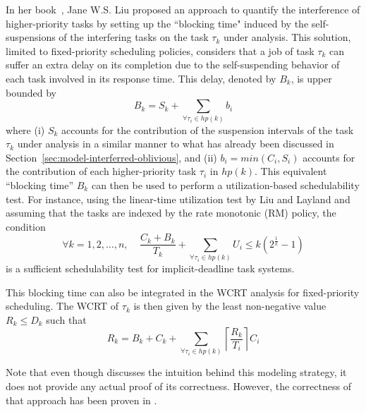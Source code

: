 \label{sec:model-interfering-blocking}

In her book~\cite[Pages 164-165]{Liu:2000:RS:518501}, Jane W.S. Liu proposed an approach to quantify the interference of
higher-priority tasks by setting up the ``blocking time" induced by the self-suspensions of the interfering tasks on the 
task $\tau_k$ under analysis. This solution, limited to fixed-priority scheduling policies, considers that a job of 
task $\tau_k$ can suffer an extra delay on its completion due to the self-suspending behavior of each task involved in its 
response time. This delay, denoted by $B_k$, is upper bounded by 
\begin{equation*}
B_k=S_k+\sum_{\forall \tau_i \in hp(k)} b_i
\end{equation*}
where (i) $S_k$ accounts for the contribution of the suspension intervals of the task $\tau_k$ under analysis in a similar manner to 
what has already been discussed in Section~\ref{sec:model-interferred-oblivious}, and (ii) $b_i=min(C_i, S_i)$ accounts for the contribution of each higher-priority task $\tau_i$ in $hp(k)$. This equivalent ``blocking time'' $B_k$ can then be used to perform a utilization-based schedulability test. For instance, using the linear-time utilization test by Liu and Layland \cite{Liu_1973} and assuming that the tasks are indexed by the rate monotonic (RM) policy, the condition
\begin{equation*}
\forall k=1,2,\ldots, n,\;\;\;\;\frac{C_k+B_k}{T_k} + \sum_{\forall \tau_i \in hp(k)} U_i \leq k (2^{\frac{1}{k}}-1)
\end{equation*}
is a sufficient schedulability test for implicit-deadline task systems.

This blocking time can also be integrated in the WCRT analysis for fixed-priority scheduling. The WCRT of $\tau_k$ is then given by the least non-negative value $R_k \leq D_k$ such that
\begin{equation*}
R_k = B_k + C_k + \sum_{\forall \tau_i \in hp(k)} \left\lceil \frac{R_k}{T_i} \right\rceil C_i
\end{equation*}


Note that even though \cite{Liu:2000:RS:518501} discusses the intuition behind this modeling strategy, it does not provide any actual proof of its correctness. 
However, the correctness of that approach has been proven in \cite{ChenHuangNelissen,ChenECRTS2016-suspension}. 

